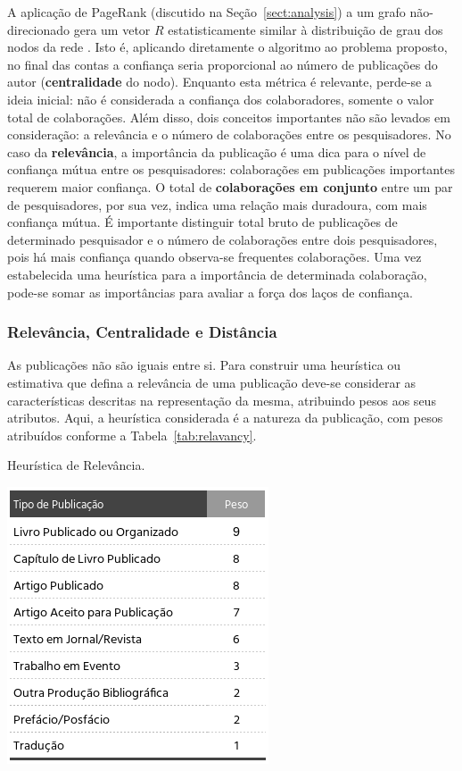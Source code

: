 \documentclass[12pt]{article}
\begin{document}
A aplicação de PageRank (discutido na Seção~\ref{sect:analysis}) a um grafo não-direcionado gera um vetor $R$ estatisticamente similar à distribuição de grau dos nodos da rede \cite{perra2008spectral}. Isto é, aplicando diretamente o algoritmo ao problema proposto, no final das contas a confiança seria proporcional ao número de publicações do autor (\textbf{centralidade} do nodo). Enquanto esta métrica é relevante, perde-se a ideia inicial: não é considerada a confiança dos colaboradores, somente o valor total de colaborações. Além disso, dois conceitos importantes não são levados em consideração: a relevância e o número de colaborações entre os pesquisadores. No caso da \textbf{relevância}, a importância da publicação é uma dica para o nível de confiança mútua entre os pesquisadores: colaborações em publicações importantes requerem maior confiança. O total de \textbf{colaborações em conjunto} entre um par de pesquisadores, por sua vez, indica uma relação mais duradoura, com mais confiança mútua. É importante distinguir 
total bruto de publicações de determinado pesquisador e o número de colaborações entre dois pesquisadores, pois há mais confiança 
quando observa-se frequentes colaborações.  Uma vez estabelecida uma heurística para a importância de determinada colaboração, 
pode-se somar as importâncias para avaliar a força dos laços de confiança.

\subsubsection{Relevância, Centralidade e Distância} \label{sect:relevancy}

As publicações não são iguais entre si. Para construir uma heurística ou estimativa que defina a relevância de uma publicação deve-se considerar as características descritas na representação da mesma, atribuindo pesos aos seus atributos. Aqui, a heurística considerada é a natureza da publicação, com pesos atribuídos conforme a Tabela~\ref{tab:relavancy}.


\begin{table}[ht]
    \centering
    \caption{Heurística de Relevância.}
    \label{tab:relavancy}
    \includegraphics[width=.35\textwidth]{heuristics.png}
\end{table}
\end{document}
